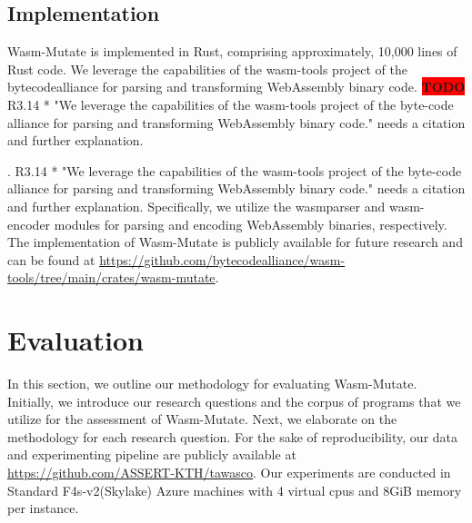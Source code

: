 \documentclass[a4paper,fleqn]{cas-dc}
\newcommand*\badge[1]{ \colorbox{red}{\color{white}#1}}
\newcommand{\tool}{{\sc Wasm-Mutate}\xspace}
\newcommand{\Wasm}{WebAssembly\xspace}
\newcommand{\repourl}{\url{https://github.com/bytecodealliance/wasm-tools/tree/main/crates/wasm-mutate}}
\newcommand{\dataurl}{\url{https://github.com/ASSERT-KTH/tawasco}}
\newcommand{\todo}[1]{%
\refstepcounter{todo}
\noindent\textbf{\badge{TODO}} {\color{red}#1}
\addcontentsline{td}{todo}
{\color{red}\thesection.\thetodo\xspace #1}}
\begin{document}
\subsection{Implementation}

\tool is implemented in Rust, comprising approximately, 10,000 lines of Rust code. 
We leverage the capabilities of the wasm-tools project of the bytecodealliance for parsing and transforming WebAssembly binary code. 
\todo{R3.14 * "We leverage the capabilities of the wasm-tools project of the byte-code alliance for parsing and transforming WebAssembly binary code." needs a citation and further explanation.}
Specifically, we utilize the wasmparser and wasm-encoder modules for parsing and encoding WebAssembly binaries, respectively.
The implementation of \tool is publicly available for future research and can be found at \repourl.





\section {Evaluation}
\label{eval}

In this section, we outline our methodology for evaluating \tool.
Initially, we introduce our research questions and the corpus of programs that we utilize for the assessment of \tool.
Next, we elaborate on the methodology for each research question.
For the sake of reproducibility, our data and experimenting pipeline are publicly available at \dataurl.
Our experiments are conducted in Standard F4s-v2(Skylake) Azure machines with 4 virtual cpus and 8GiB memory per instance.


\newcommand\rqstatic{To what extent are the program variants generated by \tool statically different from the original programs?\xspace}

\newcommand\rqdynamic{How fast can \tool generate program variants that exhibit different execution traces?\xspace}

\newcommand\rqdefensive{To what extent does \tool prevent side-channel attacks on \Wasm programs?\xspace}
\end{document}
